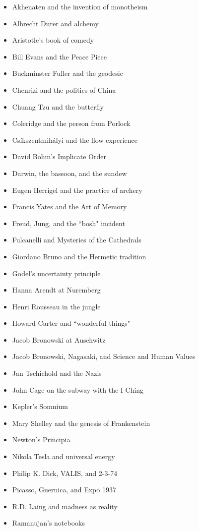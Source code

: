 \documentclass[10pt,DIV09,letterpaper,oneside,headsepline]{scrreprt}
\begin{document}
\begin{itemize}
\item Akhenaten and the invention of monotheism
\item Albrecht Durer and alchemy
\item Aristotle's book of comedy
\item Bill Evans and the Peace Piece
\item Buckminster Fuller and the geodesic
\item Chenrizi and the politics of China
\item Chuang Tzu and the butterfly
\item Coleridge and the person from Porlock
\item Csíkszentmihályi and the flow experience
\item David Bohm's Implicate Order
\item Darwin, the bassoon, and the sundew
\item Eugen Herrigel and the practice of archery
\item Francis Yates and the Art of Memory
\item Freud, Jung, and the ``bosh" incident
\item Fulcanelli and Mysteries of the Cathedrals
\item Giordano Bruno and the Hermetic tradition
\item Godel's uncertainty principle
\item Hanna Arendt at Nuremberg
\item Henri Rousseau in the jungle
\item Howard Carter and ``wonderful things"
\item Jacob Bronowski at Auschwitz
\item Jacob Bronowski, Nagasaki, and Science and Human Values
\item Jan Tschichold and the Nazis
\item John Cage on the subway with the I Ching
\item Kepler's Somnium
\item Mary Shelley and the genesis of Frankenstein
\item Newton's Principia
\item Nikola Tesla and universal energy
\item Philip K. Dick, VALIS, and 2-3-74
\item Picasso, Guernica, and Expo 1937
\item R.D. Laing and madness as reality
\item Ramanujan's notebooks

\end{itemize}
\end{document}
